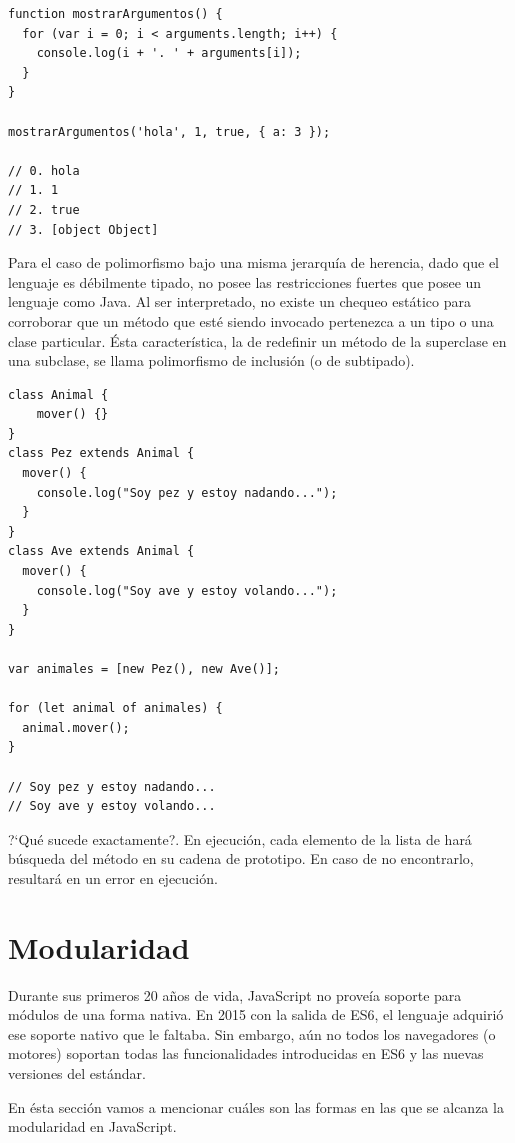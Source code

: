 \begin{lstlisting}[title={Analizando \code{arguments}}]
function mostrarArgumentos() {
  for (var i = 0; i < arguments.length; i++) {
    console.log(i + '. ' + arguments[i]);
  }
}

mostrarArgumentos('hola', 1, true, { a: 3 });

// 0. hola
// 1. 1
// 2. true
// 3. [object Object]
\end{lstlisting}

Para el caso de polimorfismo bajo una misma jerarquía de herencia, dado que el lenguaje es débilmente tipado, no posee las restricciones fuertes que posee un lenguaje como Java. Al ser interpretado, no existe un chequeo estático para corroborar que un método que esté siendo invocado pertenezca a un tipo o una clase particular. Ésta característica, la de redefinir un método de la superclase en una subclase, se llama polimorfismo de inclusión (o de subtipado).

\begin{lstlisting}
class Animal {
	mover() {}
}
class Pez extends Animal {
  mover() {
    console.log("Soy pez y estoy nadando...");
  }
}
class Ave extends Animal {
  mover() {
    console.log("Soy ave y estoy volando...");
  }
}

var animales = [new Pez(), new Ave()];

for (let animal of animales) {
  animal.mover();
}

// Soy pez y estoy nadando...
// Soy ave y estoy volando...
\end{lstlisting}

?`Qué sucede exactamente?. En ejecución, cada elemento de la lista de  hará búsqueda del método  en su cadena de prototipo. En caso de no encontrarlo, resultará en un error en ejecución. 

\section{Modularidad}
\label{sec:modulos}

Durante sus primeros 20 años de vida, JavaScript no proveía soporte para módulos de una forma nativa. En 2015 con la salida de ES6, el lenguaje adquirió ese soporte nativo que le faltaba. Sin embargo, aún no todos los navegadores (o motores) soportan todas las funcionalidades introducidas en ES6 y las nuevas versiones del estándar.

En ésta sección vamos a mencionar cuáles son las formas en las que se alcanza la modularidad en JavaScript.

